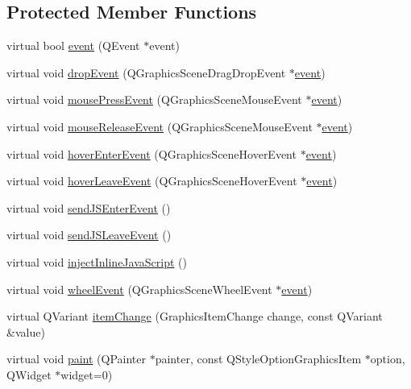 \subsection*{Protected Member Functions}
\begin{DoxyCompactItemize}
\item 
virtual bool \hyperlink{class_u_b_graphics_widget_item_af3a35c5d51a0da4a6c226b733125c74c}{event} (Q\-Event $\ast$event)
\item 
virtual void \hyperlink{class_u_b_graphics_widget_item_adf3606e613c7887cb64bb622d6b69b8b}{drop\-Event} (Q\-Graphics\-Scene\-Drag\-Drop\-Event $\ast$\hyperlink{class_u_b_graphics_widget_item_af3a35c5d51a0da4a6c226b733125c74c}{event})
\item 
virtual void \hyperlink{class_u_b_graphics_widget_item_abda10c29bc2df03fde049819175aafb6}{mouse\-Press\-Event} (Q\-Graphics\-Scene\-Mouse\-Event $\ast$\hyperlink{class_u_b_graphics_widget_item_af3a35c5d51a0da4a6c226b733125c74c}{event})
\item 
virtual void \hyperlink{class_u_b_graphics_widget_item_a7aa9657ecba4a5f13401aa459ae94d02}{mouse\-Release\-Event} (Q\-Graphics\-Scene\-Mouse\-Event $\ast$\hyperlink{class_u_b_graphics_widget_item_af3a35c5d51a0da4a6c226b733125c74c}{event})
\item 
virtual void \hyperlink{class_u_b_graphics_widget_item_ac3a8096e17f1c5135546d26d7925a14a}{hover\-Enter\-Event} (Q\-Graphics\-Scene\-Hover\-Event $\ast$\hyperlink{class_u_b_graphics_widget_item_af3a35c5d51a0da4a6c226b733125c74c}{event})
\item 
virtual void \hyperlink{class_u_b_graphics_widget_item_a31ac09903577a9c8841f48b1ae514822}{hover\-Leave\-Event} (Q\-Graphics\-Scene\-Hover\-Event $\ast$\hyperlink{class_u_b_graphics_widget_item_af3a35c5d51a0da4a6c226b733125c74c}{event})
\item 
virtual void \hyperlink{class_u_b_graphics_widget_item_a08a18024b86c176cfe003cf127333b98}{send\-J\-S\-Enter\-Event} ()
\item 
virtual void \hyperlink{class_u_b_graphics_widget_item_a344ea2ea166e555c121e7dc13c3cffa6}{send\-J\-S\-Leave\-Event} ()
\item 
virtual void \hyperlink{class_u_b_graphics_widget_item_a1636344ba3f46afa8402df7c1b0a7d4b}{inject\-Inline\-Java\-Script} ()
\item 
virtual void \hyperlink{class_u_b_graphics_widget_item_a8bcad09a0d127ac5ebabaafd18b872e8}{wheel\-Event} (Q\-Graphics\-Scene\-Wheel\-Event $\ast$\hyperlink{class_u_b_graphics_widget_item_af3a35c5d51a0da4a6c226b733125c74c}{event})
\item 
virtual Q\-Variant \hyperlink{class_u_b_graphics_widget_item_afa7d1efa7e0e6818a9b1951eb3c4445c}{item\-Change} (Graphics\-Item\-Change change, const Q\-Variant \&value)
\item 
virtual void \hyperlink{class_u_b_graphics_widget_item_a3fbce75a406ee0cd0563c5f5c2571c1b}{paint} (Q\-Painter $\ast$painter, const Q\-Style\-Option\-Graphics\-Item $\ast$option, Q\-Widget $\ast$widget=0)
\end{DoxyCompactItemize}
